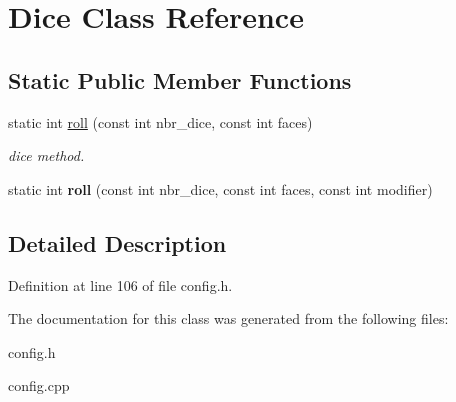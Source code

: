 \hypertarget{class_dice}{}\section{Dice Class Reference}
\label{class_dice}
\subsection*{Static Public Member Functions}
\begin{DoxyCompactItemize}
\item 
\hypertarget{class_dice_ac94cb9c94fccfc5579310769b39056a6}{}\label{class_dice_ac94cb9c94fccfc5579310769b39056a6} 
static int \hyperlink{class_dice_ac94cb9c94fccfc5579310769b39056a6}{roll} (const int nbr\+\_\+dice, const int faces)
\begin{DoxyCompactList}\small\item\em dice method. \end{DoxyCompactList}\item 
\hypertarget{class_dice_a1b9a9c31860b6e8b980ea5e3bf4494cd}{}\label{class_dice_a1b9a9c31860b6e8b980ea5e3bf4494cd} 
static int {\bfseries roll} (const int nbr\+\_\+dice, const int faces, const int modifier)
\end{DoxyCompactItemize}


\subsection{Detailed Description}


Definition at line 106 of file config.\+h.



The documentation for this class was generated from the following files\+:\begin{DoxyCompactItemize}
\item 
config.\+h\item 
config.\+cpp\end{DoxyCompactItemize}
